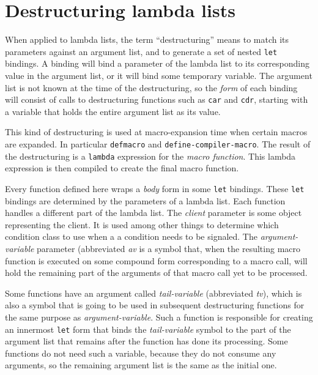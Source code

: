 \chapter{Destructuring lambda lists}
\label{chap-destructuring-lambda-lists}

When applied to lambda lists, the term ``destructuring'' means to
match its parameters against an argument list, and to generate a set
of nested \texttt{let} bindings.  A binding will bind a parameter of
the lambda list to its corresponding value in the argument list, or it
will bind some temporary variable.  The argument list is not known at
the time of the destructuring, so the \emph{form} of each binding will
consist of calls to destructuring functions such as \texttt{car} and
\texttt{cdr}, starting with a variable that holds the entire argument
list as its value.

This kind of destructuring is used at macro-expansion time when
certain macros are expanded.  In particular \texttt{defmacro} and
\texttt{define-compiler-macro}.  The result of the destructuring is a
\texttt{lambda} expression for the \emph{macro function}.  This lambda
expression is then compiled to create the final macro function.

Every function defined here wraps a \textit{body} form in some
\texttt{let} bindings.  These \texttt{let} bindings are determined by
the parameters of a lambda list.  Each function handles a different
part of the lambda list.  The \textit{client} parameter is some object
representing the client.  It is used among other things to determine
which condition class to use when a a condition needs to be signaled.
The \textit{argument-variable} parameter (abbreviated \textit{av} is a
symbol that, when the resulting macro function is executed on some
compound form corresponding to a macro call, will hold the remaining
part of the arguments of that macro call yet to be processed.

Some functions have an argument called \textit{tail-variable}
(abbreviated \textit{tv}), which is also a symbol that is going to be
used in subsequent destructuring functions for the same purpose as
\textit{argument-variable}.  Such a function is responsible for
creating an innermost \texttt{let} form that binds the
\textit{tail-variable} symbol to the part of the argument list that
remains after the function has done its processing.  Some functions do
not need such a variable, because they do not consume any arguments,
so the remaining argument list is the same as the initial one.

